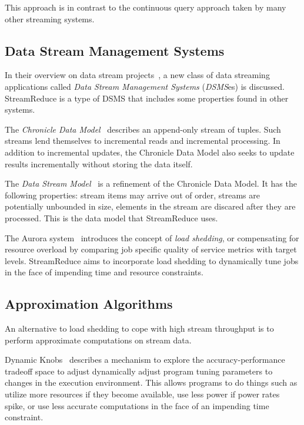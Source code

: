 \documentclass[12pt,twocolumn]{article}
\begin{document}
This approach is in contrast to the continuous query approach taken by many other streaming
systems.

\subsection{Data Stream Management Systems}
In their overview on data stream projects~\cite{Babcock:2002:MID:543613.543615},
a new class of data streaming applications
called \emph{Data Stream Management Systems} (\emph{DSMS}es) is discussed.
StreamReduce is a type of DSMS that includes some properties found in other systems.

The \emph{Chronicle Data Model}~\cite{Jagadish:1995:VMI:212433.220201} describes an
append-only stream of tuples. Such
streams lend themselves to incremental reads and incremental processing. In addition to incremental
updates, the Chronicle Data Model also seeks to update results incrementally without storing the
data itself.

The \emph{Data Stream Model}~\cite{Babcock:2002:MID:543613.543615} is a refinement of the Chronicle
Data Model. It has the following properties: stream items may arrive out of order,
streams are potentially unbounded in size, elements in the stream are discared after they are
processed. This is the data model that StreamReduce uses.

The Aurora system~\cite{Carney:2002:MSN:1287369.1287389} introduces the concept of
\emph{load shedding}, or compensating for
resource overload by comparing job specific quality of service metrics with target levels.
StreamReduce aims to incorporate load shedding to dynamically tune jobs in the face of
impending time and resource constraints.

\subsection{Approximation Algorithms}
An alternative to load shedding to cope with high stream throughput is to perform approximate
computations on stream data.

Dynamic Knobs~\cite{Hoffmann:2011:DKR:1950365.1950390} describes a mechanism to explore the
accuracy-performance tradeoff space to adjust dynamically adjust program tuning parameters
to changes in the execution environment. This allows programs to do things such as
utilize more resources if they become available, use less power if power rates spike,
or use less accurate computations in the face of an impending time constraint.
\end{document}
